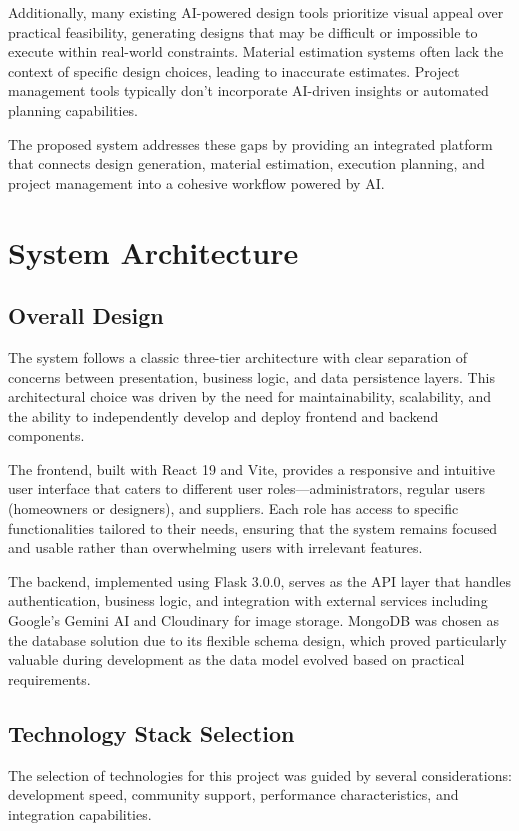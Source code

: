 \documentclass[conference]{IEEEtran}
\begin{document}
Additionally, many existing AI-powered design tools prioritize visual appeal over practical feasibility, generating designs that may be difficult or impossible to execute within real-world constraints. Material estimation systems often lack the context of specific design choices, leading to inaccurate estimates. Project management tools typically don't incorporate AI-driven insights or automated planning capabilities.

The proposed system addresses these gaps by providing an integrated platform that connects design generation, material estimation, execution planning, and project management into a cohesive workflow powered by AI.

\section{System Architecture}

\subsection{Overall Design}
The system follows a classic three-tier architecture with clear separation of concerns between presentation, business logic, and data persistence layers. This architectural choice was driven by the need for maintainability, scalability, and the ability to independently develop and deploy frontend and backend components.

The frontend, built with React 19 and Vite, provides a responsive and intuitive user interface that caters to different user roles—administrators, regular users (homeowners or designers), and suppliers. Each role has access to specific functionalities tailored to their needs, ensuring that the system remains focused and usable rather than overwhelming users with irrelevant features.

The backend, implemented using Flask 3.0.0, serves as the API layer that handles authentication, business logic, and integration with external services including Google's Gemini AI and Cloudinary for image storage. MongoDB was chosen as the database solution due to its flexible schema design, which proved particularly valuable during development as the data model evolved based on practical requirements.

\subsection{Technology Stack Selection}
The selection of technologies for this project was guided by several considerations: development speed, community support, performance characteristics, and integration capabilities.
\end{document}

